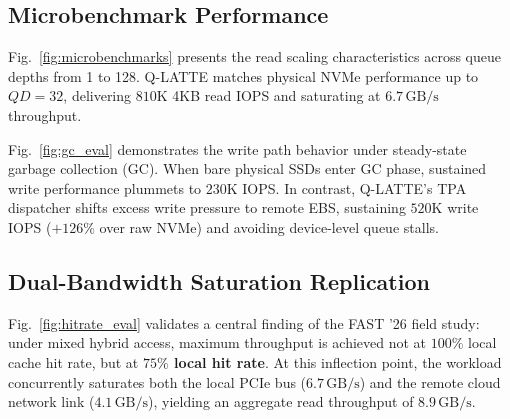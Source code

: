\documentclass[lettersize,journal]{IEEEtran}
\begin{document}
\subsection{Microbenchmark Performance}
Fig.~\ref{fig:microbenchmarks} presents the read scaling characteristics across queue depths from 1 to 128. Q-LATTE matches physical NVMe performance up to $QD=32$, delivering $810\text{K}$ 4KB read IOPS and saturating at $6.7\,\text{GB/s}$ throughput.

Fig.~\ref{fig:gc_eval} demonstrates the write path behavior under steady-state garbage collection (GC). When bare physical SSDs enter GC phase, sustained write performance plummets to $230\text{K}$ IOPS. In contrast, Q-LATTE's TPA dispatcher shifts excess write pressure to remote EBS, sustaining $520\text{K}$ write IOPS ($+126\%$ over raw NVMe) and avoiding device-level queue stalls.

\subsection{Dual-Bandwidth Saturation Replication}
Fig.~\ref{fig:hitrate_eval} validates a central finding of the FAST '26 field study: under mixed hybrid access, maximum throughput is achieved not at $100\%$ local cache hit rate, but at \textbf{$75\%$ local hit rate}. At this inflection point, the workload concurrently saturates both the local PCIe bus ($6.7\,\text{GB/s}$) and the remote cloud network link ($4.1\,\text{GB/s}$), yielding an aggregate read throughput of \textbf{$8.9\,\text{GB/s}$}.

\begin{table}[t]
\centering
\caption{Consolidated Performance and Cost Evaluation Matrix}
\label{tab:results}
\end{table}
\end{document}
